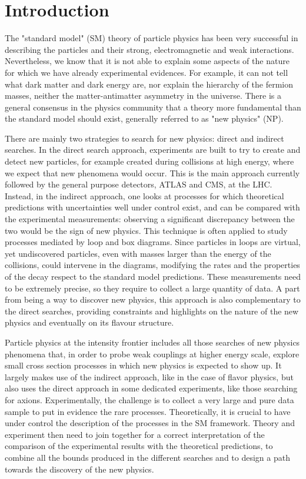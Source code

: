 
\section{Introduction}

The "standard model" (SM) theory of particle physics has been very successful in describing the particles and their strong, electromagnetic and weak interactions. Nevertheless,  we know that it is not able to explain some aspects of the nature for which we have already experimental evidences. For example, it can not tell what dark matter and dark energy are, nor explain the hierarchy of the fermion masses, neither the matter-antimatter asymmetry in the universe. There is a  general consensus in the physics community that a theory more fundamental than the standard model should exist, generally referred to as "new physics" (NP). 

There are mainly two strategies  to search for new physics: direct and indirect searches.  In the direct search approach, experiments are built to try to create and detect new particles, for example  created during collisions at high energy, where we expect that new phenomena would occur. This is the main approach currently followed by the general purpose detectors, ATLAS and CMS, at the LHC. Instead, in the indirect approach,  one  looks  at processes for which theoretical predictions with uncertainties well under control  exist, and can be compared with  the experimental measurements:  observing a significant discrepancy between the two would be the sign of new physics. This technique is often applied to study processes mediated by loop and box diagrams.  Since particles in loops are virtual, yet undiscovered particles, even  with masses larger than the energy of the collisions, could intervene in the diagrams, modifying the rates and the properties of the decay respect to  the standard model predictions. These measurements need to be extremely precise, so they require to collect a large quantity of data.  A part from being a way to discover new physics, this approach is also  complementary  to the direct searches, providing constraints and highlights on the nature of the new physics and eventually on its flavour structure. 

Particle physics at the intensity frontier includes all those searches of new physics phenomena that, in order to probe weak couplings at higher energy scale, explore small cross section processes in which new physics is expected to show up. It largely makes use of the indirect approach, like in the case of flavor physics, but also uses the direct approach in some dedicated experiments,  like those searching for axions.  Experimentally, the challenge is to collect a very large and pure data sample to  put in evidence the rare processes. Theoretically, it is crucial to have under control the description of the processes in the SM framework. Theory and experiment then need to join together for a correct interpretation of the comparison of the experimental results with the theoretical predictions, to combine all the bounds produced in the different searches and to design a path towards the discovery of the new physics. 

